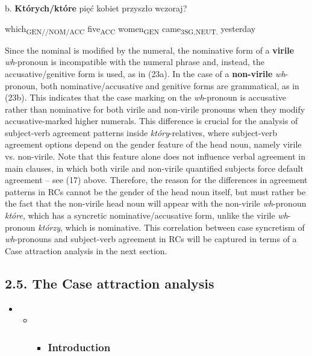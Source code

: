 \documentclass[output=paper]{langsci/langscibook}
\begin{document}
  b.   \textbf{Których/które}  pięć     kobiet   przyszło     wczoraj?

    which\textsubscript{GEN//NOM/ACC} five\textsubscript{ACC} women\textsubscript{GEN}   came\textsubscript{3SG,NEUT.} yesterday

\begin{styleListParagraph}
Since the nominal is modified by the numeral, the nominative form of a \textbf{virile} \textit{wh}{}-pronoun is incompatible with the numeral phrase and, instead, the accusative/genitive form is used, as in (23a). In the case of a \textbf{non-virile} \textit{wh}{}-pronoun, both nominative/accusative and genitive forms are grammatical, as in (23b). This indicates that the case marking on the \textit{wh}{}-pronoun is accusative rather than nominative for both virile and non-virile pronouns when they modify accusative-marked higher numerals. This difference is crucial for the analysis of subject-verb agreement patterns inside \textit{który}{}-relatives, where subject-verb agreement options depend on the gender feature of the head noun, namely virile vs. non-virile. Note that this feature alone does not influence verbal agreement in main clauses, in which both virile and non-virile quantified subjects force default agreement – see (17) above. Therefore, the reason for the differences in agreement patterns in RCs cannot be the gender of the head noun itself, but must rather be the fact that the non-virile head noun will appear with the non-virile \textit{wh}{}-pronoun \textit{które}, which has a syncretic nominative/accusative form, unlike the virile \textit{wh}{}-pronoun \textit{którzy}, which is nominative. This correlation between case syncretism of \textit{wh}{}-pronouns and subject-verb agreement in RCs will be captured in terms of a Case attraction analysis in the next section.
\end{styleListParagraph}

\subsection{ 2.5. The Case attraction analysis}

\setcounter{itemize}{1}
\begin{itemize}
\item \setcounter{itemize}{4}
\begin{itemize}
\item \begin{itemize}
\item \subsubsection{ Introduction}\end{itemize}
\end{itemize}
\end{itemize}
\end{document}

